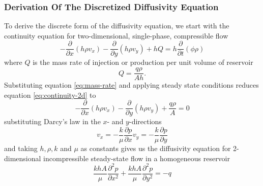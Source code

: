 \subsubsection{Derivation Of The Discretized Diffusivity Equation} %
\label{ssub:derivation}
To derive the discrete form of the diffusivity equation, we  start with the continuity equation for two-dimensional, single-phase, compressible flow \cite{Peaceman1977Fundamentals}
\begin{equation}
    \label{eq:continuity-2d}
    - \frac{\partial}{\partial x} \left( h\rho v_x \right) - \frac{\partial}{\partial y} \left( h\rho v_y \right) + hQ = h \frac{\partial }{\partial t} \left( \phi \rho \right)
\end{equation}
where $Q$ is the mass rate of injection or production per unit volume of reservoir
\begin{equation}
    \label{eq:mass-rate}
    Q = \frac{q\rho}{Ah}.
\end{equation}
Substituting equation \eqref{eq:mass-rate} and applying steady state conditions reduces equation \eqref{eq:continuity-2d} to
\begin{equation}
    - \frac{\partial}{\partial x} \left( h\rho v_x \right) - \frac{\partial}{\partial y} \left( h\rho v_y \right) + \frac{q\rho}{A} = 0
\end{equation}
substituting Darcy's law in the $x$- and $y$-directions \cite{Peaceman1977Fundamentals}
\begin{subequations}
    \begin{equation}
        v_x = -\frac{k}{\mu} \frac{\partial p}{\partial x}
    \end{equation}
    \begin{equation}
        v_y = -\frac{k}{\mu} \frac{\partial p}{\partial y}
    \end{equation}
\end{subequations}
and taking $h,\rho,k$ and $\mu$ as constants gives us the diffusivity equation for 2-dimensional incompressible steady-state flow in a homogeneous reservoir
\begin{equation}
    \label{eq:differential-flow}
    \frac{khA}{\mu} \frac{\partial^2 p}{\partial x^2}  + \frac{khA}{\mu} \frac{\partial^2 p}{\partial y^2} = -q
\end{equation}

